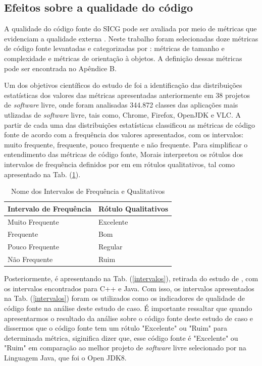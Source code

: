 \subsection[Efeitos sobre a qualidade do código]{Efeitos sobre a qualidade do código}

A qualidade do código fonte do SICG pode ser avaliada por meio de métricas que evidenciam a qualidade externa \cite{ISO25023}. Neste trabalho foram selecionadas doze métricas de código fonte levantadas e categorizadas por : métricas de tamanho e complexidade e métricas de orientação à objetos. A definição dessas métricas pode ser encontrada no Apêndice B.


Um dos objetivos científicos do estudo de  foi a identificação das distribuições estatísticas dos valores das métricas apresentadas anteriormente em 38 projetos de \textit{software} livre, onde foram analisadas 344.872 classes das aplicações mais utlizadas de \textit{software} livre, tais como, Chrome, Firefox, OpenJDK e VLC. A partir de cada uma das distribuições estatísticas  classificou as métricas de código fonte de acordo com a frequência dos valores apresentados,
com os intervalos: muito frequente, frequente, pouco frequente e não frequente. Para simplificar o entendimento das métricas de código fonte, Morais interpretou os rótulos dos
intervalos de frequência definidos por  em em rótulos qualitativos, tal como apresentado na Tab. (\ref{nomes}). 

\begin{table}[!ht]
	\begin{center}
	 \begin{tabular}{|l|l|}
		\hline
		\textbf{Intervalo de Frequência} & \textbf{Rótulo Qualitativos} \\ \hline
		Muito Frequente & Excelente \\ \hline
		Frequente       & Bom       \\ \hline
		Pouco Frequente & Regular   \\ \hline
		Não Frequente   & Ruim      \\ \hline
		\end{tabular}
		\caption{Nome dos Intervalos de Frequência e Qualitativos}
		\label{nomes}
		\end{center}
		\end{table}


Posteriormente, é apresentando na Tab. (\ref{intervalos}), retirada do
estudo de , com os intervalos encontrados para C++ e Java. Com isso, os intervalos apresentados na Tab. (\ref{intervalos}) foram os utilizados como os indicadores
de qualidade de código fonte na análise deste estudo de caso. É importante ressaltar que quando apresentarmos o resultado da análise sobre o código fonte deste estudo de caso e dissermos que o código fonte tem um rótulo "Excelente" ou "Ruim" para determinada métrica, siginifica dizer que, esse código fonte é "Excelente" ou "Ruim" em comparação ao melhor projeto de \textit{software} livre selecionado por  na Linguagem Java, que foi o Open JDK8.


